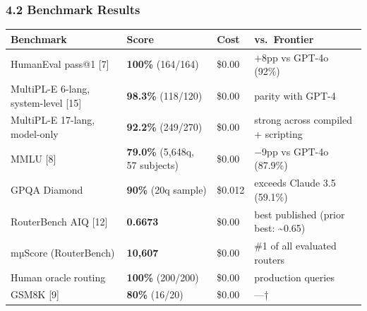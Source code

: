 \subsubsection{4.2 Benchmark Results}\label{benchmark-results}

{\def\LTcaptype{none} %
\begin{longtable}[]{@{}
  >{\raggedright\arraybackslash}p{}
  >{\raggedright\arraybackslash}p{}
  >{\raggedright\arraybackslash}p{}
  >{\raggedright\arraybackslash}p{}@{}}
\toprule\noalign{}
\begin{minipage}[b]{\linewidth}\raggedright
Benchmark
\end{minipage} & \begin{minipage}[b]{\linewidth}\raggedright
Score
\end{minipage} & \begin{minipage}[b]{\linewidth}\raggedright
Cost
\end{minipage} & \begin{minipage}[b]{\linewidth}\raggedright
vs.~Frontier
\end{minipage} \\
\midrule\noalign{}
\endhead
\bottomrule\noalign{}
\endlastfoot
HumanEval pass@1 {[}7{]} & \textbf{100\%} (164/164) & \$0.00 & +8pp vs GPT-4o (92\%) \\
MultiPL-E 6-lang, system-level {[}15{]} & \textbf{98.3\%} (118/120) & \$0.00 & parity with GPT-4 \\
MultiPL-E 17-lang, model-only & \textbf{92.2\%} (249/270) & \$0.00 & strong across compiled + scripting \\
MMLU {[}8{]} & \textbf{79.0\%} (5,648q, 57 subjects) & \$0.00 & −9pp vs GPT-4o (87.9\%) \\
GPQA Diamond & \textbf{90\%} (20q sample) & \$0.012 & exceeds Claude 3.5 (59.1\%) \\
RouterBench AIQ {[}12{]} & \textbf{0.6673} & \$0.00 & best published (prior best: \textasciitilde0.65) \\
mµScore (RouterBench) & \textbf{10,607} & \$0.00 & \#1 of all evaluated routers \\
Human oracle routing & \textbf{100\%} (200/200) & \$0.00 & 200 production queries \\
GSM8K {[}9{]} & \textbf{80\%} (16/20) & \$0.00 & ---† \\
\end{longtable}
}

